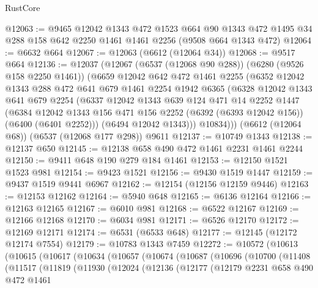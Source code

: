 \begin{lexlean}{RustCore}
\begin{coremodule}
@12063 := @9465
    @12042
    @1343
    @472
    @1523
    @664
    @90
    @1343
    @472
    @1495
    @34
    @288
    @158
    @642
    @2250
    @1461
    @1461
    @2256
    (@9508 @664 @1343 @472)
@12064 := @6632 @664
@12067 := @12063 (@6612 (@12064 @34))
@12068 := @9517 @664
@12136 := @12037
    (@12067
      (@6537 (@12068 @90 @288))
      (@6280 (@9526 @158 @2250 @1461))
      (@6659
        @12042
        @642
        @472
        @1461
        @2255
        (@6352
          @12042
          @1343
          @288
          @472
          @641
          @679
          @1461
          @2254
          @1942
          @6365
          (@6328
            @12042
            @1343
            @641
            @679
            @2254
            (@6337
              @12042
              @1343
              @639
              @124
              @471
              @14
              @2252
              @1447
              (@6384
                @12042
                @1343
                @156
                @471
                @156
                @2252
                (@6392 (@6393 @12042 @156))
                (@6400 (@6401 @2252)))
              (@6494 @12042 @1343)))
          @10834)))
    (@6612 (@12064 @68))
    (@6537 (@12068 @177 @298))
    @9611
@12137 := @10749 @1343
@12138 := @12137 @650
@12145 := @12138 @658 @490 @472 @1461 @2231 @1461 @2244
@12150 := @9411 @648 @190 @279 @184 @1461
@12153 := @12150 @1521 @1523 @981
@12154 := @9423 @1521
@12156 := @9430 @1519 @1447
@12159 := @9437 @1519 @9441 @6967
@12162 := @12154 (@12156 @12159 @9446)
@12163 := @12153 @12162
@12164 := @5940 @648
@12165 := @6136 @12164
@12166 := @12163 @12165
@12167 := @6010 @981
@12168 := @6522 @12167
@12169 := @12166 @12168
@12170 := @6034 @981
@12171 := @6526 @12170
@12172 := @12169 @12171
@12174 := @6531 (@6533 @648)
@12177 := @12145 (@12172 @12174 @7554)
@12179 := @10783 @1343 @7459
@12272 := @10572
    (@10613
      (@10615
        (@10617
          (@10634
            (@10657
              (@10674
                (@10687
                  (@10696
                    (@10700
                      (@11408
                        (@11517
                          (@11819
                            (@11930
                              (@12024
                                (@12136
                                  (@12177
                                    (@12179
                                      @2231
                                      @658
                                      @490
                                      @472
                                      @1461

\end{coremodule}
\end{lexlean}
